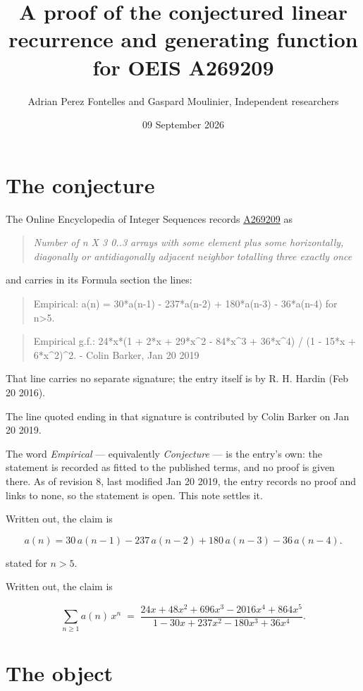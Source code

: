 \documentclass[11pt]{article}
\title{A proof of the conjectured linear recurrence and generating function for OEIS A269209}
\author{Adrian Perez Fontelles and Gaspard Moulinier, Independent researchers}
\date{09 September 2026}
\theoremstyle{definition}
\begin{document}
\maketitle
\section{The conjecture}

The Online Encyclopedia of Integer Sequences records \href{https://oeis.org/A269209}{A269209} as

\begin{quote}\itshape Number of n X 3 0..3 arrays with some element plus some horizontally, diagonally or antidiagonally adjacent neighbor totalling three exactly once\end{quote}

and carries in its Formula section the lines:

\begin{quote}\ttfamily Empirical: a(n) = 30*a(n-1) - 237*a(n-2) + 180*a(n-3) - 36*a(n-4) for n>5.\end{quote}

\begin{quote}\ttfamily Empirical g.f.: 24*x*(1 + 2*x + 29*x\textasciicircum{}2 - 84*x\textasciicircum{}3 + 36*x\textasciicircum{}4) / (1 - 15*x + 6*x\textasciicircum{}2)\textasciicircum{}2. - Colin Barker, Jan 20 2019\end{quote}

That line carries no separate signature; the entry itself is by R. H. Hardin (Feb 20 2016).

The line quoted ending in that signature is contributed by Colin Barker on Jan 20 2019.

The word {\itshape Empirical} --- equivalently {\itshape Conjecture} --- is the entry's own: the statement is recorded as fitted to the published terms, and no proof is given there. As of revision 8, last modified Jan 20 2019, the entry records no proof and links to none, so the statement is open. This note settles it.

Written out, the claim is

\[a(n) = 30\,a(n-1) - 237\,a(n-2) + 180\,a(n-3) - 36\,a(n-4).\]

stated for $n > 5$.

Written out, the claim is

\[\sum_{n \ge 1} a(n)\,x^n \;=\; \frac{24x + 48x^{2} + 696x^{3} - 2016x^{4} + 864x^{5}}{1 - 30x + 237x^{2} - 180x^{3} + 36x^{4}}.\]

\section{The object}
\end{document}
